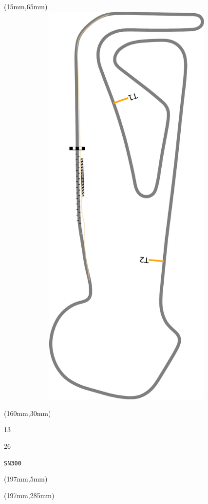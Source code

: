 \begin{textblock*}{185mm}(15mm,65mm)%
\centering
\mbox{\includegraphics[width=185mm,height=210mm,keepaspectratio]{PT/SN300.pdf}}
\end{textblock*}
\begin{textblock*}{40mm}(160mm,30mm)%
\Large
\par{} 
\par13 
\par26 
\par\hfill\tiny\tt SN300\\
\end{textblock*}
\begin{textblock*}{20mm}(197mm,5mm)%
\fbox{\thepage}
\label{SN300}
\end{textblock*}
\begin{textblock*}{20mm}(197mm,285mm)%
\fbox{\thepage}
\end{textblock*}

